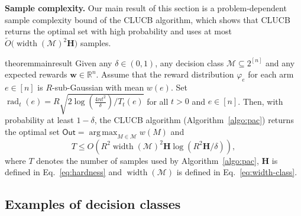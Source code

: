 \documentclass{article}
\newcommand{\junk}[1]{}
\newcommand{\Algorithm}{{\small \textsf{CLUCB}}\xspace}
\newcommand{\Rew}{\varphi}
\newcommand{\M}{\mathcal M}
\newcommand{\B}{\mathcal B}
\newcommand{\RR}{\mathbb R}
\DeclareMathOperator{\rank}{width}
\DeclareMathOperator{\rad}{rad}
\DeclareMathOperator*{\argmax}{arg\,max}
\newcommand{\out}{\mathsf{Out}}
\newcommand{\MultiIdent}{\textsc{TopK}\xspace}
\newcommand{\Matroid}{\textsc{Matroid}\xspace}
\newcommand{\Match}{\textsc{Match}\xspace}
\newcommand{\Path}{\textsc{Path}\xspace}
\renewcommand{\vec}[1]{\boldsymbol{#1}}
\begin{document}
\textbf{Sample complexity.} 
Our main result of this section is a problem-dependent sample complexity bound of the \Algorithm algorithm, which shows that \Algorithm returns the optimal set with high probability and uses at most $\tilde O\big(\rank(\M)^2 \mathbf H\big)$ samples.
\begin{restatable}{theorem}{mainresult}
Given any $\delta \in (0,1)$, any decision class $\M \subseteq 2^{[n]}$ and any expected rewards $\vec w \in \RR^{n}$.
Assume that the reward distribution $\Rew_e$ for each arm $e\in [n]$ is  $R$-sub-Gaussian with mean $w(e)$.
Set $\rad_t(e) = R\sqrt{2\log\left(\frac{4n t^2}\delta\right)/ T_t(e) }$ for all $t > 0$ and $e\in[n]$.
Then, with probability at least $1-\delta$, the \Algorithm algorithm (Algorithm~\ref{algo:pac}) returns the optimal set $\out=\argmax_{M\in \M} w(M)$ and
\begin{equation}
\label{eq:sample-complexity}
T \le O\left(R^2\rank(\M)^2\mathbf H\log\left(R^2 \mathbf H /\delta\right)\right),
\end{equation}
where $T$ denotes the number of samples used by Algorithm~\ref{algo:pac}, $\mathbf H$ is defined in Eq.~\eqref{eq:hardness} and $\rank(\M)$ is defined in Eq.~\eqref{eq:width-class}.
\label{theorem:main}
\end{restatable}
\junk{
By combining Lemma~\ref{lemma:example-exchange-class} and Theorem~\ref{theorem:main}, we can bound the sample complexity of \Algorithm for our running examples.
\begin{corollary}
\begin{itemize}
	\item \MultiIdent. $T \le O\big(\mathbf H \log(n\mathbf H/\delta)\big)$.
	\item \Matroid. $T \le O\big(\mathbf H \log(n\mathbf H/\delta)\big)$.
	\item \Match. $T \le O\big(|V|^2 \mathbf H \log(n |V|^2 \mathbf H/\delta)\big)$.
	\item \Path. $T \le O\big(|V|^2 \mathbf H \log(n |V|^2 \mathbf H/\delta)\big)$.
\end{itemize}
\end{corollary}
}


\vspace{-0.5em}
\subsection{Examples of decision classes}
\vspace{-0.5em}
\label{section:example}
\end{document}
